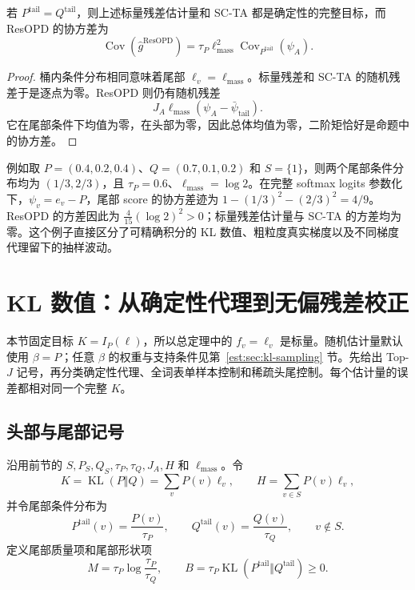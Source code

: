 \documentclass[lang=cn,scheme=chinese,openany]{../book/elegantbook}
\newcommand{\KL}{\operatorname{KL}}
\newcommand{\tail}{\mathrm{tail}}
\begin{document}
\begin{proposition}
若 $P^{\tail}=Q^{\tail}$，则上述标量残差估计量和 SC-TA 都是确定性的完整目标，而 ResOPD 的协方差为
\begin{equation*}
 \operatorname{Cov}(\widehat g^{\mathrm{ResOPD}})
 =\tau_P\ell_{\mathrm{mass}}^2\operatorname{Cov}_{P^{\tail}}(\psi_A).
\end{equation*}
\end{proposition}

\begin{proof}
桶内条件分布相同意味着尾部 $\ell_v=\ell_{\mathrm{mass}}$。标量残差和 SC-TA 的随机残差于是逐点为零。ResOPD 则仍有随机残差
\begin{equation*}
 J_A\ell_{\mathrm{mass}}(\psi_A-\bar \psi_\tail).
\end{equation*}
它在尾部条件下均值为零，在头部为零，因此总体均值为零，二阶矩恰好是命题中的协方差。
\end{proof}

例如取 $P=(0.4,0.2,0.4)$、$Q=(0.7,0.1,0.2)$ 和 $S=\{1\}$，则两个尾部条件分布均为 $(1/3,2/3)$，且 $\tau_P=0.6$、$\ell_{\mathrm{mass}}=\log2$。在完整 softmax logits 参数化下，$\psi_v=e_v-P$，尾部 score 的协方差迹为 $1-(1/3)^2-(2/3)^2=4/9$。ResOPD 的方差因此为 $\frac4{15}(\log2)^2>0$；标量残差估计量与 SC-TA 的方差均为零。这个例子直接区分了可精确积分的 KL 数值、粗粒度真实梯度以及不同梯度代理留下的抽样波动。



\section{KL 数值：从确定性代理到无偏残差校正}
\label{est:sec:kl-scalar}
本节固定目标 $K=I_P(\ell)$，所以总定理中的 $f_v=\ell_v$ 是标量。随机估计量默认使用 $\beta=P$；任意 $\beta$ 的权重与支持条件见第~\ref{est:sec:kl-sampling} 节。先给出 Top-$J$ 记号，再分类确定性代理、全词表单样本控制和稀疏头尾控制。每个估计量的误差都相对同一个完整 $K$。
\subsection{头部与尾部记号}

沿用前节的 $S,P_S,Q_S,\tau_P,\tau_Q,J_A,H$ 和 $\ell_{\mathrm{mass}}$。令
\begin{equation*}
 K=\KL(P\Vert Q)=\sum_vP(v)\ell_v,
 \qquad H=\sum_{v\in S}P(v)\ell_v,
 \end{equation*}
并令尾部条件分布为
\begin{equation*}
 P^{\tail}(v)=\frac{P(v)}{\tau_P},\qquad
 Q^{\tail}(v)=\frac{Q(v)}{\tau_Q},\qquad v\notin S.
\end{equation*}
定义尾部质量项和尾部形状项
\begin{equation*}
 M=\tau_P\log\frac{\tau_P}{\tau_Q},\qquad
 B=\tau_P\KL(P^{\tail}\Vert Q^{\tail})\geq0.
\end{equation*}
\end{document}
